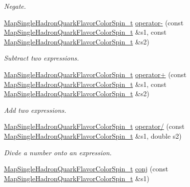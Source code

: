 \begin{DoxyCompactItemize}
\begin{DoxyCompactList}\small\item\em Negate. \end{DoxyCompactList}\item 
\mbox{\hyperlink{namespaceHadron_a03b319764f85c20434f20a269ce5f388}{Map\+Single\+Hadron\+Quark\+Flavor\+Color\+Spin\+\_\+t}} \mbox{\hyperlink{namespaceHadron_ad7c424c3185becdcc1423060951ff98e}{operator-\/}} (const \mbox{\hyperlink{namespaceHadron_a03b319764f85c20434f20a269ce5f388}{Map\+Single\+Hadron\+Quark\+Flavor\+Color\+Spin\+\_\+t}} \&s1, const \mbox{\hyperlink{namespaceHadron_a03b319764f85c20434f20a269ce5f388}{Map\+Single\+Hadron\+Quark\+Flavor\+Color\+Spin\+\_\+t}} \&s2)
\begin{DoxyCompactList}\small\item\em Subtract two expressions. \end{DoxyCompactList}\item 
\mbox{\hyperlink{namespaceHadron_a03b319764f85c20434f20a269ce5f388}{Map\+Single\+Hadron\+Quark\+Flavor\+Color\+Spin\+\_\+t}} \mbox{\hyperlink{namespaceHadron_a168571d9c710321169dad756440c1952}{operator+}} (const \mbox{\hyperlink{namespaceHadron_a03b319764f85c20434f20a269ce5f388}{Map\+Single\+Hadron\+Quark\+Flavor\+Color\+Spin\+\_\+t}} \&s1, const \mbox{\hyperlink{namespaceHadron_a03b319764f85c20434f20a269ce5f388}{Map\+Single\+Hadron\+Quark\+Flavor\+Color\+Spin\+\_\+t}} \&s2)
\begin{DoxyCompactList}\small\item\em Add two expressions. \end{DoxyCompactList}\item 
\mbox{\hyperlink{namespaceHadron_a03b319764f85c20434f20a269ce5f388}{Map\+Single\+Hadron\+Quark\+Flavor\+Color\+Spin\+\_\+t}} \mbox{\hyperlink{namespaceHadron_ae43d51b030dac0dd81991cf7c401507a}{operator/}} (const \mbox{\hyperlink{namespaceHadron_a03b319764f85c20434f20a269ce5f388}{Map\+Single\+Hadron\+Quark\+Flavor\+Color\+Spin\+\_\+t}} \&s1, double s2)
\begin{DoxyCompactList}\small\item\em Divde a number onto an expression. \end{DoxyCompactList}\item 
\mbox{\hyperlink{namespaceHadron_a03b319764f85c20434f20a269ce5f388}{Map\+Single\+Hadron\+Quark\+Flavor\+Color\+Spin\+\_\+t}} \mbox{\hyperlink{namespaceHadron_a225bbef2231c488eb28201396913bae0}{conj}} (const \mbox{\hyperlink{namespaceHadron_a03b319764f85c20434f20a269ce5f388}{Map\+Single\+Hadron\+Quark\+Flavor\+Color\+Spin\+\_\+t}} \&s1)

\end{DoxyCompactItemize}
